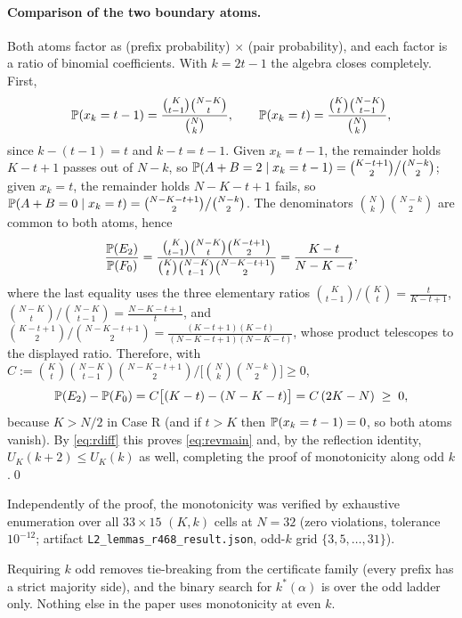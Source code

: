 \paragraph{Comparison of the two boundary atoms.}
Both atoms factor as (prefix probability) $\times$ (pair probability), and
each factor is a ratio of binomial coefficients. With $k=2t-1$ the algebra
closes completely. First,
\[
\P(x_k=t-1)=\frac{\binom{K}{t-1}\binom{N-K}{t}}{\binom{N}{k}},
\qquad
\P(x_k=t)=\frac{\binom{K}{t}\binom{N-K}{t-1}}{\binom{N}{k}},
\]
since $k-(t-1)=t$ and $k-t=t-1$. Given $x_k=t-1$, the remainder holds
$K-t+1$ passes out of $N-k$, so
$\P(A+B=2\mid x_k=t-1)=\binom{K-t+1}{2}\big/\binom{N-k}{2}$; given $x_k=t$,
the remainder holds $N-K-t+1$ fails, so
$\P(A+B=0\mid x_k=t)=\binom{N-K-t+1}{2}\big/\binom{N-k}{2}$. The
denominators $\binom{N}{k}\binom{N-k}{2}$ are common to both atoms, hence
\[
\frac{\P(E_2)}{\P(F_0)}
=\frac{\binom{K}{t-1}\binom{N-K}{t}\binom{K-t+1}{2}}
{\binom{K}{t}\binom{N-K}{t-1}\binom{N-K-t+1}{2}}
=\frac{K-t}{N-K-t},
\]
where the last equality uses the three elementary ratios
$\binom{K}{t-1}\big/\binom{K}{t}=\frac{t}{K-t+1}$,
$\binom{N-K}{t}\big/\binom{N-K}{t-1}=\frac{N-K-t+1}{t}$, and
$\binom{K-t+1}{2}\big/\binom{N-K-t+1}{2}=\frac{(K-t+1)(K-t)}{(N-K-t+1)(N-K-t)}$,
whose product telescopes to the displayed ratio. Therefore, with
$C:=\binom{K}{t}\binom{N-K}{t-1}\binom{N-K-t+1}{2}\big/
\big[\binom{N}{k}\binom{N-k}{2}\big]\ge 0$,
\begin{equation}
\label{eq:atomdiff}
\P(E_2)-\P(F_0)=C\big[(K-t)-(N-K-t)\big]=C\,(2K-N)\;\ge\;0,
\end{equation}
because $K>N/2$ in Case R (and if $t>K$ then $\P(x_k=t-1)=0$, so both atoms
vanish). By \eqref{eq:rdiff} this proves \eqref{eq:revmain} and, by the
reflection identity, $U_K(k+2)\le U_K(k)$ as well, completing the proof of
monotonicity along odd $k$.\qed

\begin{remark}[Verification at $N=32$]
Independently of the proof, the monotonicity was verified by exhaustive
enumeration over all $33\times15$ $(K,k)$ cells at $N=32$ (zero violations,
tolerance $10^{-12}$; artifact \texttt{L2\_lemmas\_r468\_result.json},
odd-$k$ grid $\{3,5,\dots,31\}$).
\end{remark}

\begin{remark}
Requiring $k$ odd removes tie-breaking from the certificate family
(every prefix has a strict majority side), and the binary search for
$k^*(\alpha)$ is over the odd ladder only. Nothing else in the paper uses
monotonicity at even $k$.
\end{remark}

